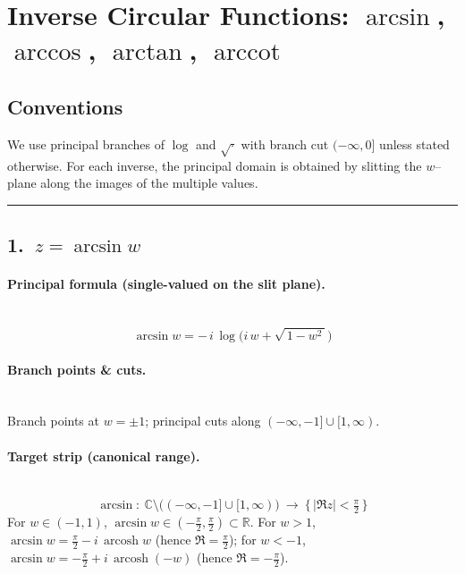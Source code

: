 \documentclass[11pt]{article}
\newcommand{\BoxEq}[1]{\begin{equation*}\boxed{\displaystyle #1}\end{equation*}}
\DeclareMathOperator{\arccot}{arccot}
\begin{document}

\section*{Inverse Circular Functions: $\arcsin$, $\arccos$, $\arctan$, $\arccot$}

\subsection*{Conventions}
We use principal branches of $\log$ and $\sqrt{\cdot}$ with branch cut $(-\infty,0]$ unless stated otherwise.
For each inverse, the principal domain is obtained by slitting the $w$–plane along the images of the multiple values.

\bigskip\hrule\bigskip

\subsection*{1.\ $z=\arcsin w$}

\paragraph{Principal formula (single-valued on the slit plane).}\mbox{}\\[2pt]
\BoxEq{ \arcsin w = -\,i\,\log\!\Big(i\,w+\sqrt{\,1-w^{2}\,}\Big) }

\paragraph{Branch points \& cuts.}\mbox{}\\[2pt]
Branch points at $w=\pm1$; principal cuts along $(-\infty,-1]\cup[1,\infty)$.

\paragraph{Target strip (canonical range).}\mbox{}\\[2pt]
\BoxEq{ \arcsin:\ \mathbb C\setminus\big((-\infty,-1]\cup[1,\infty)\big)\ \longrightarrow\ \{\,|\Re z|<\tfrac{\pi}{2}\,\} }
For $w\in(-1,1)$, $\arcsin w\in(-\tfrac{\pi}{2},\tfrac{\pi}{2})\subset\mathbb R$.
For $w>1$,
$\arcsin w=\tfrac{\pi}{2}-i\,\operatorname{arcosh} w$ (hence $\Re=\tfrac{\pi}{2}$);
for $w<-1$,
$\arcsin w=-\tfrac{\pi}{2}+i\,\operatorname{arcosh}(-w)$ (hence $\Re=-\tfrac{\pi}{2}$).
\end{document}
